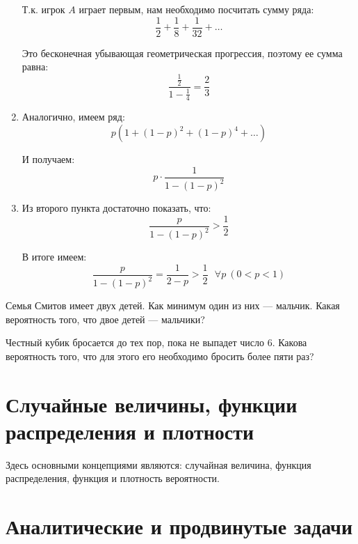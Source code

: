 \documentclass[document]{subfiles}
\begin{document}
\begin{solution}
\begin{enumerate}
\begin{tikzpicture}[
            frac/.style={sloped, midway, above, font=\small}
        ]
        \end{tikzpicture} 

        Т.к. игрок $A$ играет первым, нам необходимо посчитать сумму ряда:
        \[\frac{1}{2} + \frac{1}{8} + \frac{1}{32} + \dots\]

        Это бесконечная убывающая геометрическая прогрессия, поэтому ее сумма равна:
        \[\frac{\frac{1}{2}}{1 - \frac{1}{4}} = \frac{2}{3}\]
        
        \item Аналогично, имеем ряд:
        \[p (1 + (1-p)^2 + (1-p)^4 + \dots)\]
        
        И получаем:
        \[p \cdot \frac{1}{1 - (1 - p)^2}\]
        
        \item Из второго пункта достаточно показать, что:
            \[\frac{p}{1 - (1-p)^2} > \frac{1}{2}\]

            В итоге имеем:
            \[\frac{p}{1 - (1-p)^2} = \frac{1}{2 - p} > \frac{1}{2} ~~~\forall p ~(0 < p < 1)\]

    \end{enumerate}
\end{solution}

\begin{problem}
    Семья Смитов имеет двух детей. Как минимум один из них --- мальчик. Какая вероятность того, что двое детей --- мальчики?
\end{problem}
\begin{solution}
    
\end{solution}

\begin{problem}
    Честный кубик бросается до тех пор, пока не выпадет число $6$. Какова вероятность того, что для этого его необходимо бросить более пяти раз?
\end{problem}
\begin{solution}
    
\end{solution}

\section{Случайные величины, функции распределения и плотности}

Здесь основными концепциями являются: случайная величина, функция распределения, функция и плотность вероятности.

\section{Аналитические и продвинутые задачи}
\end{document}
